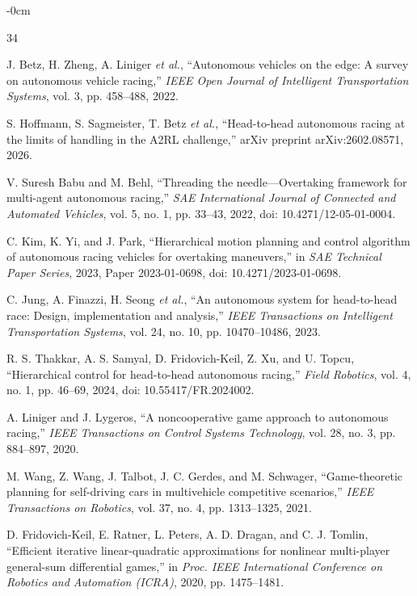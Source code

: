 \documentclass[sensors,article,submit,moreauthors]{Definitions/mdpi}
\begin{document}
\begin{adjustwidth}{-\extralength}{0cm}
\begin{thebibliography}{34}

J. Betz, H. Zheng, A. Liniger \emph{et al.},
``Autonomous vehicles on the edge: A survey on autonomous vehicle racing,''
\emph{IEEE Open Journal of Intelligent Transportation Systems}, vol. 3,
pp. 458--488, 2022.

S. Hoffmann, S. Sagmeister, T. Betz \emph{et al.},
``Head-to-head autonomous racing at the limits of handling in the A2RL
challenge,'' arXiv preprint arXiv:2602.08571, 2026.

V. Suresh Babu and M. Behl,
``Threading the needle---Overtaking framework for multi-agent autonomous
racing,'' \emph{SAE International Journal of Connected and Automated
Vehicles}, vol. 5, no. 1, pp. 33--43, 2022,
doi: 10.4271/12-05-01-0004.

C. Kim, K. Yi, and J. Park,
``Hierarchical motion planning and control algorithm of autonomous racing
vehicles for overtaking maneuvers,'' in \emph{SAE Technical Paper Series},
2023, Paper 2023-01-0698, doi: 10.4271/2023-01-0698.

C. Jung, A. Finazzi, H. Seong \emph{et al.},
``An autonomous system for head-to-head race: Design, implementation and
analysis,'' \emph{IEEE Transactions on Intelligent Transportation Systems},
vol. 24, no. 10, pp. 10470--10486, 2023.

R. S. Thakkar, A. S. Samyal, D. Fridovich-Keil, Z. Xu, and U. Topcu,
``Hierarchical control for head-to-head autonomous racing,''
\emph{Field Robotics}, vol. 4, no. 1, pp. 46--69, 2024,
doi: 10.55417/FR.2024002.

A. Liniger and J. Lygeros,
``A noncooperative game approach to autonomous racing,''
\emph{IEEE Transactions on Control Systems Technology}, vol. 28, no. 3,
pp. 884--897, 2020.

M. Wang, Z. Wang, J. Talbot, J. C. Gerdes, and M. Schwager,
``Game-theoretic planning for self-driving cars in multivehicle competitive
scenarios,'' \emph{IEEE Transactions on Robotics}, vol. 37, no. 4,
pp. 1313--1325, 2021.

D. Fridovich-Keil, E. Ratner, L. Peters, A. D. Dragan, and C. J. Tomlin,
``Efficient iterative linear-quadratic approximations for nonlinear
multi-player general-sum differential games,'' in \emph{Proc. IEEE
International Conference on Robotics and Automation (ICRA)}, 2020,
pp. 1475--1481.


\end{thebibliography}
\end{adjustwidth}
\end{document}
